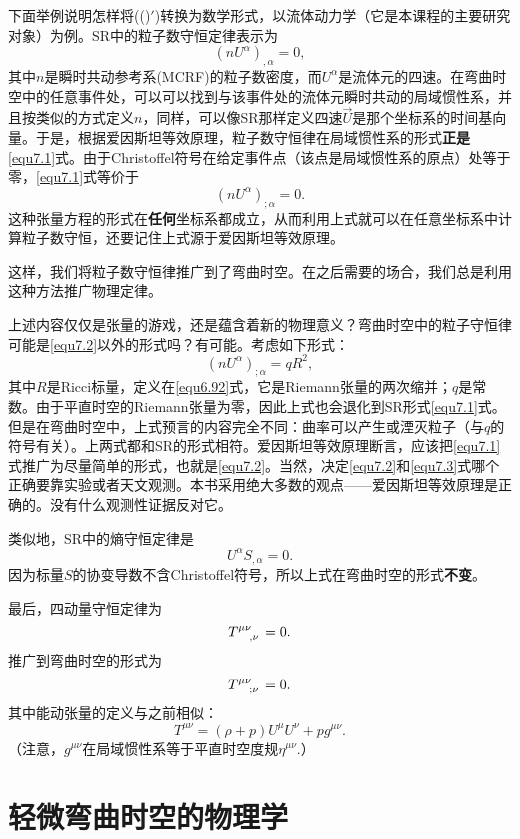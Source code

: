 下面举例说明怎样将((\uppercase\expandafter{})$'$)转换为数学形式，以流体动力学（它是本课程的主要研究对象）为例。SR中的粒子数守恒定律表示为
\begin{equation}
    (n U^\alpha)_{, \alpha} = 0,
\label{equ7.1}
\end{equation}
其中$n$是瞬时共动参考系(MCRF)的粒子数密度，而$U^\alpha$是流体元的四速。在弯曲时空中的任意事件处，可以可以找到与该事件处的流体元瞬时共动的局域惯性系，并且按类似的方式定义$n$，同样，可以像SR那样定义四速$\vec{U}$是那个坐标系的时间基向量。于是，根据爱因斯坦等效原理，粒子数守恒律在局域惯性系的形式\textbf{正是}\eqref{equ7.1}式。由于Christoffel符号在给定事件点（该点是局域惯性系的原点）处等于零，\eqref{equ7.1}式等价于
\begin{equation}
    (n U^\alpha)_{; \alpha} = 0.
\label{equ7.2}
\end{equation}
这种张量方程的形式在\textbf{任何}坐标系都成立，从而利用上式就可以在任意坐标系中计算粒子数守恒，还要记住上式源于爱因斯坦等效原理。

这样，我们将粒子数守恒律推广到了弯曲时空。在之后需要的场合，我们总是利用这种方法推广物理定律。

上述内容仅仅是张量的游戏，还是蕴含着新的物理意义？弯曲时空中的粒子守恒律可能是\eqref{equ7.2}以外的形式吗？有可能。考虑如下形式：
\begin{equation}
    (n U^\alpha)_{; \alpha} = qR^2,
\label{equ7.3}
\end{equation}
其中$R$是Ricci标量，定义在\eqref{equ6.92}式，它是Riemann张量的两次缩并；$q$是常数。由于平直时空的Riemann张量为零，因此上式也会退化到SR形式\eqref{equ7.1}式。但是在弯曲时空中，上式预言的内容完全不同：曲率可以产生或湮灭粒子（与$q$的符号有关）。上两式都和SR的形式相符。爱因斯坦等效原理断言，应该把\eqref{equ7.1}式推广为尽量简单的形式，也就是\eqref{equ7.2}。当然，决定\eqref{equ7.2}和\eqref{equ7.3}式哪个正确要靠实验或者天文观测。本书采用绝大多数的观点——爱因斯坦等效原理是正确的。没有什么观测性证据反对它。

类似地，SR中的熵守恒定律是
\begin{equation}
    U^\alpha S_{, \alpha} = 0.
\label{equ7.4}
\end{equation}
因为标量$S$的协变导数不含Christoffel符号，所以上式在弯曲时空的形式\textbf{不变}。

最后，四动量守恒定律为
\begin{equation}
    T\indices{^{\mu \nu}_{, \nu}} = 0.
\label{equ7.5}
\end{equation}
推广到弯曲时空的形式为
\begin{equation}
    T\indices{^{\mu \nu}_{; \nu}} = 0.
\label{equ7.6}
\end{equation}
其中能动张量的定义与之前相似：
\begin{equation}
    T^{\mu \nu} = (\rho + p) U^\mu U^\nu + p g^{\mu \nu}.
\label{equ7.7}
\end{equation}
（注意，$g^{\mu \nu}$在局域惯性系等于平直时空度规$\eta^{\mu \nu}$.）

\section{轻微弯曲时空的物理学}
\label{sec7.2}